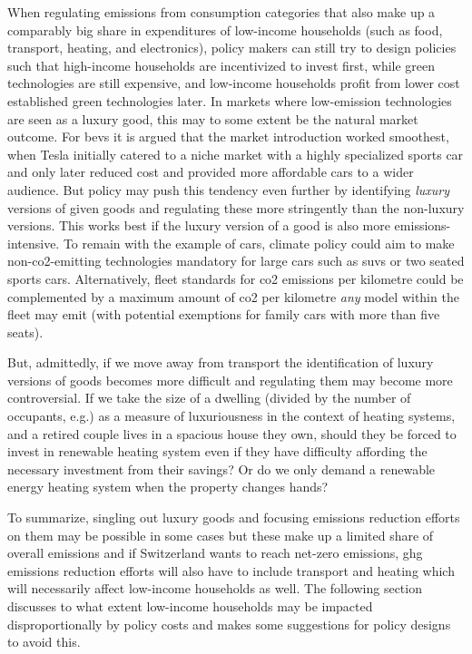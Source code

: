 \documentclass[a4paper,11pt,abstract=true]{scrartcl}
\begin{document}
When regulating emissions from consumption categories that also make up a comparably big share in expenditures of low-income households (such as food, transport, heating, and electronics), policy makers can still try to design policies such that high-income households are incentivized to invest first, while green technologies are still expensive, and low-income households profit from lower cost established green technologies later.
In markets where low-emission technologies are seen as a luxury good, this may to some extent be the natural market outcome.
For \acp{bev} it is argued that the market introduction worked smoothest, when Tesla initially catered to a niche market with a highly specialized sports car and only later reduced cost and provided more affordable cars to a wider audience.
But policy may push this tendency even further by identifying \emph{luxury} versions of given goods and regulating these more stringently than the non-luxury versions.
This works best if the luxury version of a good is also more emissions-intensive.
To remain with the example of cars, climate policy could aim to make non-\ac{co2}-emitting technologies mandatory for large cars such as \acp{suv} or two seated sports cars.
Alternatively, fleet standards for \ac{co2} emissions per kilometre could be complemented by a maximum amount of \ac{co2} per kilometre \emph{any} model within the fleet may emit (with potential exemptions for family cars with more than five seats).

But, admittedly, if we move away from transport the identification of luxury versions of goods becomes more difficult and regulating them may become more controversial.
If we take the size of a dwelling (divided by the number of occupants, e.g.) as a measure of luxuriousness in the context of heating systems, and a retired couple lives in a spacious house they own, should they be forced to invest in renewable heating system even if they have difficulty affording the necessary investment from their savings?
Or do we only demand a renewable energy heating system when the property changes hands?

To summarize, singling out luxury goods and focusing emissions reduction efforts on them may be possible in some cases but these make up a limited share of overall emissions and if Switzerland wants to reach net-zero emissions, \ac{ghg} emissions reduction efforts will also have to include  transport and heating which will necessarily affect low-income households as well.
The following section discusses to what extent low-income households may be impacted disproportionally by policy costs and makes some suggestions for policy designs to avoid this.
\end{document}
